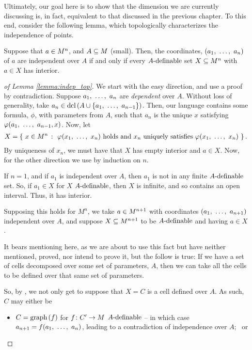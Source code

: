 Ultimately, our goal here is to show that the dimension we are currently discussing is, in fact, equivalent to that discussed in the previous chapter. To this end, consider the following lemma, which topologically characterizes the independence of points.

\begin{lemma}
  Suppose that $\aMn[a]{n}$, and $\AM[A]$ (small). Then, the coordinates, $(\vonevm{a}{n})$ of $a$ are independent over $A$ if and only if every $\Adefnb$ set $\XMn[X]{n}$ with $a \in X$ has \inhb interior.
  \label{lemma:indep_top}
\end{lemma}

\begin{proof}[of Lemma \ref{lemma:indep_top}]
  We start with the easy direction, and use a proof by contradiction. Suppose $\vonevm{a}{n}$ are \emph{dependent} over $A$. Without loss of generality, take $a_n \in \dcl{A \cup \{ \vonevm{a}{n-1} \}}$. Then, our language contains some formula, $\phi$, with parameters from $A$, such that $a_n$ is the unique $x$ satisfying $\phi(\vonevm{a}{n-1}, x)$. Now, let
    \begin{align*}
      X = \left\{ \ \aMn[x]{n} \ \colon \ \phi(\vonevm{x}{n}) \textrm{ holds and } x_n \textrm{ uniquely satisfies } \phi(\vonevm{x}{n}) \ \right\}.
    \end{align*}
  By uniqueness of $x_n$, we must have that $X$ has empty interior and $a \in X$. Now, for the other direction we use \cd by induction on $n$.

  If $n = 1$, and if $a_1$ is independent over $A$, then $a_1$ is not in any finite $\Adefnb$ set. So, if $a_1 \in X$ for $X$ $\Adefnb$, then $X$ is infinite, and so contains an open interval. Thus, it has \inhb interior.

  Supposing this holds for $M^n$, we take $\aMn[a]{n+1}$ with coordinates $(\vonevm{a}{n+1})$ independent over $A$, and suppose $\XMn[X]{n+1}$ to be $\Adefnb$ and having $a \in X$.
  \begin{svgraybox}
    It bears mentioning here, as we are about to use this fact but have neither mentioned, proved, nor intend to prove it, but the follow is true: If we have a set of cells decomposed over some set of parameters, $A$, then we can take all the cells to be defined over that same set of parameters.
  \end{svgraybox}
  So, by \cd, we not only get to suppose that $X = C$ is a cell defined over $A$. As such, $C$ may either be
    \begin{itemize}
      \item $C = \graph{f}$ for $\funcdom{f}{\pri{C}}{M}$ $\Adefnb$ -- in which case $a_{n+1} = f(\vonevm{a}{n})$, leading to a contradiction of independence over $A$; \ or


\end{itemize}
\end{proof}
